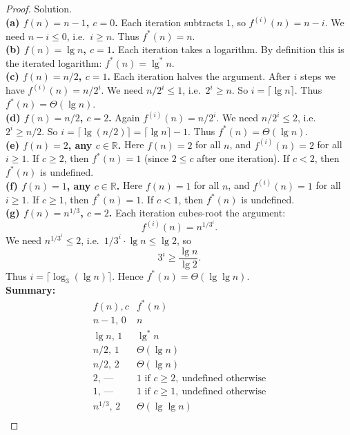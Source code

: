 \documentclass[12pt]{article}
\theoremstyle{definition}
\begin{document}
\begin{proof}
Solution. \\[-0.5ex]

\noindent\textbf{(a) $f(n)=n-1$, $c=0$.}  
Each iteration subtracts $1$, so $f^{(i)}(n)=n-i$. We need $n-i\le 0$, i.e.\ $i\ge n$.  
Thus $f^{*}(n)=n$. \\[6pt]

\noindent\textbf{(b) $f(n)=\lg n$, $c=1$.}  
Each iteration takes a logarithm. By definition this is the iterated logarithm:  
$f^{*}(n)=\lg^{*} n$. \\[6pt]

\noindent\textbf{(c) $f(n)=n/2$, $c=1$.}  
Each iteration halves the argument. After $i$ steps we have $f^{(i)}(n)=n/2^{i}$.  
We need $n/2^{i}\le 1$, i.e.\ $2^{i}\ge n$. So $i=\lceil \lg n\rceil$.  
Thus $f^{*}(n)=\Theta(\lg n)$. \\[6pt]

\noindent\textbf{(d) $f(n)=n/2$, $c=2$.}  
Again $f^{(i)}(n)=n/2^{i}$. We need $n/2^{i}\le 2$, i.e.\ $2^{i}\ge n/2$.  
So $i=\lceil \lg (n/2)\rceil=\lceil \lg n\rceil -1$.  
Thus $f^{*}(n)=\Theta(\lg n)$. \\[6pt]

\noindent\textbf{(e) $f(n)=2$, any $c\in\mathbb{R}$.}  
Here $f(n)=2$ for all $n$, and $f^{(i)}(n)=2$ for all $i\ge 1$.  
If $c\ge 2$, then $f^{*}(n)=1$ (since $2\le c$ after one iteration).  
If $c<2$, then $f^{*}(n)$ is undefined. \\[6pt]

\noindent\textbf{(f) $f(n)=1$, any $c\in\mathbb{R}$.}  
Here $f(n)=1$ for all $n$, and $f^{(i)}(n)=1$ for all $i\ge 1$.  
If $c\ge 1$, then $f^{*}(n)=1$.  
If $c<1$, then $f^{*}(n)$ is undefined. \\[6pt]

\noindent\textbf{(g) $f(n)=n^{1/3}$, $c=2$.}  
Each iteration cubes-root the argument:  
\[
f^{(i)}(n)=n^{1/3^{i}}.
\]
We need $n^{1/3^{i}}\le 2$, i.e.\ $1/3^{i}\cdot \lg n \le \lg 2$, so
\[
3^{i}\ge \frac{\lg n}{\lg 2}.
\]
Thus $i=\lceil \log_{3}(\lg n)\rceil$.  
Hence $f^{*}(n)=\Theta(\lg\lg n)$. \\

\noindent
\textbf{Summary:}  
\[
\begin{array}{c|c}
f(n),c & f^{*}(n) \\
\hline
n-1,\,0 & n \\
\lg n,\,1 & \lg^{*} n \\
n/2,\,1 & \Theta(\lg n) \\
n/2,\,2 & \Theta(\lg n) \\
2,\,\text{---} & 1 \text{ if } c\ge 2,\ \text{undefined otherwise} \\
1,\,\text{---} & 1 \text{ if } c\ge 1,\ \text{undefined otherwise} \\
n^{1/3},\,2 & \Theta(\lg\lg n) \\
\end{array}
\]
\end{proof}
\end{document}
